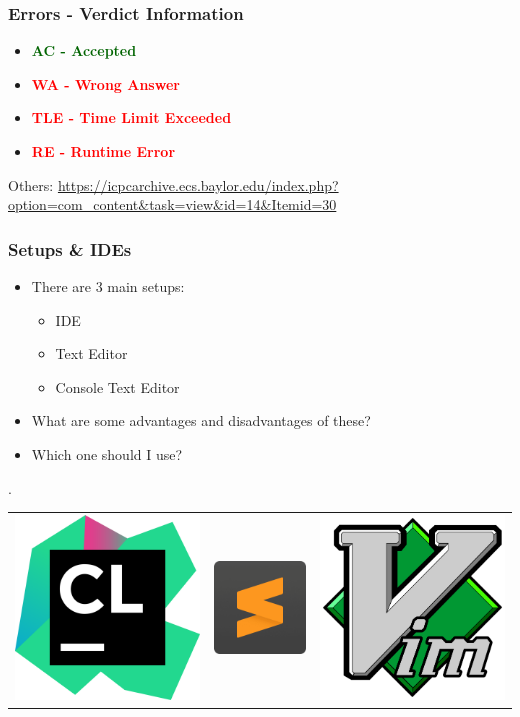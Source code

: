 \documentclass{beamer}
\begin{document}
\begin{frame}
	\frametitle{Errors - Verdict Information}

	\begin{itemize}
		\item \textcolor{darkGreen}{\textbf{AC - Accepted}}
		\item \textcolor{red}{\textbf{WA - Wrong Answer}}
		\item \textcolor{red}{\textbf{TLE - Time Limit Exceeded}}
		\item \textcolor{red}{\textbf{RE - Runtime Error}}
	\end{itemize}

	Others: \url{https://icpcarchive.ecs.baylor.edu/index.php?option=com_content&task=view&id=14&Itemid=30}
\end{frame}

\begin{frame}
	\frametitle{Setups \& IDEs}

	\begin{itemize}
		\item There are 3 main setups:
		\begin{itemize}
			\item IDE
			\item Text Editor
			\item Console Text Editor
		\end{itemize}
		\item What are some advantages and disadvantages of these?
		\item Which one should I use?
	\end{itemize}

	\vspace{5mm}

	\begin{centering}
		\setlength\tabcolsep{25pt}.
		\begin{tabular}{ c c c }
			\includegraphics[width=0.15\linewidth]{images/clion} &
			\includegraphics[width=0.15\linewidth]{images/sublime} &
			\includegraphics[width=0.15\linewidth]{images/vim}
		\end{tabular}
	\end{centering}

\end{frame}
\end{document}
